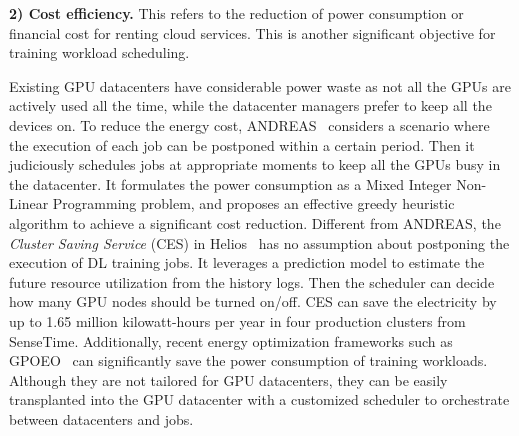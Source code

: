 \textbf{2) Cost efficiency.} This refers to the reduction of power consumption or financial cost for renting cloud services. This is another significant objective for training workload scheduling.

Existing GPU datacenters have considerable power waste as not all the GPUs are actively used all the time, while the datacenter managers prefer to keep all the devices on. To reduce the energy cost, ANDREAS~\cite{ANDREAS} considers a scenario where the execution of each job can be postponed within a certain period. Then it judiciously schedules jobs at appropriate moments to keep all the GPUs busy in the datacenter. It formulates the power consumption as a Mixed Integer Non-Linear Programming problem, and proposes an effective greedy heuristic algorithm to achieve a significant cost reduction. Different from ANDREAS, the \emph{Cluster Saving Service} (CES) in Helios~\cite{Helios} has no assumption about postponing the execution of DL training jobs. It leverages a prediction model to estimate the future resource utilization from the history logs. Then the scheduler can decide how many GPU nodes should be turned on/off. CES can save the electricity by up to 1.65 million kilowatt-hours per year in four production clusters from SenseTime. Additionally, recent energy optimization frameworks such as GPOEO~\cite{GPOEO} can significantly save the power consumption of training workloads. Although they are not tailored for GPU datacenters, they can be easily transplanted into the GPU datacenter with a customized scheduler to orchestrate between datacenters and jobs.

